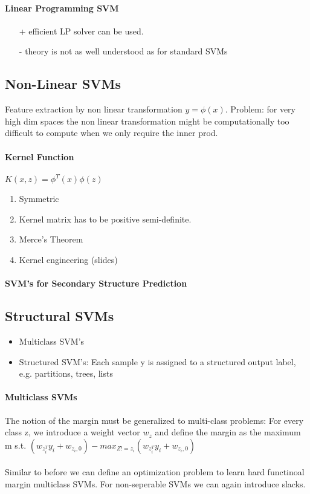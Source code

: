 \paragraph{Linear Programming SVM}
\begin{itemize}
    \item[+] efficient LP solver can be used.
    \item[-] theory is not as well understood as for standard SVMs
\end{itemize}{}

\subsection{Non-Linear SVMs}
Feature extraction by non linear transformation $y = \phi(x)$.
Problem: for very high dim spaces the non linear transformation might be computationally too difficult to compute when we only require the inner prod.

\paragraph{Kernel Function}
$K(x, z) = \phi^T(x)\phi(z)$\\
\begin{enumerate}
    \item Symmetric
    \item Kernel matrix has to be positive semi-definite.
    \item Merce's Theorem
    \item Kernel engineering (slides)
\end{enumerate}{}

\paragraph{SVM's for Secondary Structure Prediction}

\subsection{Structural SVMs}
\begin{itemize}
    \item Multiclass SVM's
    \item Structured SVM's: Each sample y is assigned to a structured output label, e.g. partitions, trees, lists
\end{itemize}{}

\paragraph{Multiclass SVMs}
The notion of the margin must be generalized to multi-class problems: For every class z, we introduce a weight vector $w_z$ and define the margin as the maximum m s.t. $(w_z_i^Ty_i + w_{z_i, 0}) - max_{Z!=z_i}(w_z_i^Ty_i + w_{z_i, 0})$\\
\\
Similar to before we can define an optimization problem to learn hard functinoal margin multiclass SVMs. For non-seperable SVMs we can again introduce slacks.

